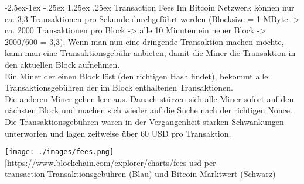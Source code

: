 \documentclass[10pt,a4paper,titlepage]{article}
\makeatletter
\renewcommand\paragraph{\@startsection{paragraph}{4}{\z@}%
            {-2.5ex\@plus -1ex \@minus -.25ex}%
            {1.25ex \@plus .25ex}%
            {\normalfont\normalsize\bfseries}}
\makeatother
\begin{document}
\paragraph{Transaction Fees}
Im Bitcoin Netzwerk können nur ca. 3,3 Transaktionen pro Sekunde durchgeführt werden (Blocksize = 1 MByte -> ca. 2000 Transaktionen pro Block -> alle 10 Minuten ein neuer Block -> 2000/600 = 3,3). Wenn man nun eine dringende Transaktion machen möchte, kann man eine Transaktionsgebühr anbieten, damit die Miner die Transaktion in den aktuellen Block aufnehmen.\\
Ein Miner der einen Block löst (den richtigen Hash findet), bekommt alle Transaktionsgebühren der im Block enthaltenen Transaktionen.\\
Die anderen Miner gehen leer aus. Danach stürzen sich alle Miner sofort auf den nächsten Block und machen sich wieder auf die Suche nach der richtigen Nonce.\\
Die Transaktionsgebühren waren in der Vergangenheit starken Schwankungen unterworfen und lagen zeitweise über 60 USD pro Transaktion.
\begin{center}
\texttt{[image: ./images/fees.png]}
[https://www.blockchain.com/explorer/charts/fees-usd-per-transaction]{Transaktionsgebühren (Blau) und Bitcoin Marktwert (Schwarz)}
\end{center}
 
\end{document}
